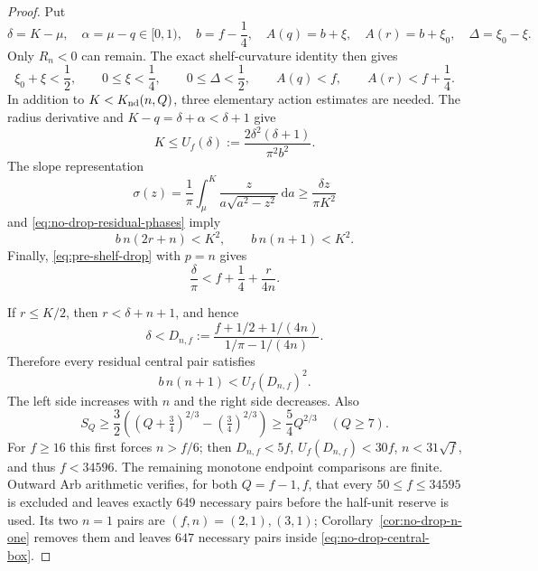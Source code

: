 \documentclass[11pt]{article}
\theoremstyle{remark}
\newcommand{\dd}{\,\mathrm d}
\begin{document}
\begin{proof}
Put
\[
 \delta=K-\mu,\quad \alpha=\mu-q\in[0,1),\quad b=f-\frac14,
 \quad A(q)=b+\xi,\quad A(r)=b+\xi_0,
 \quad\Delta=\xi_0-\xi.
\]
Only $R_n<0$ can remain.  The exact shelf-curvature identity then gives
\begin{equation}
 \xi_0+\xi<\frac12,\qquad0\leq\xi<\frac14,\qquad
 0\leq\Delta<\frac12,\qquad A(q)<f,\qquad A(r)<f+\frac14.
 \label{eq:no-drop-residual-phases}
\end{equation}
In addition to $K<K_{\rm nd}(n,Q)$, three elementary action estimates are
needed.  The radius derivative and $K-q=\delta+\alpha<\delta+1$ give
\begin{equation}
 K\leq U_f(\delta):=
 \frac{2\delta^2(\delta+1)}{\pi^2b^2}.
 \label{eq:no-drop-upper-geometry}
\end{equation}
The slope representation
\[
 \sigma(z)=\frac1\pi\int_\mu^K
 \frac{z}{a\sqrt{a^2-z^2}}\dd a
 \geq\frac{\delta z}{\pi K^2}
\]
and \eqref{eq:no-drop-residual-phases} imply
\begin{equation}
 b\,n(2r+n)<K^2,\qquad b\,n(n+1)<K^2.
 \label{eq:no-drop-slope-geometry}
\end{equation}
Finally, \eqref{eq:pre-shelf-drop} with $p=n$ gives
\begin{equation}
 \frac\delta\pi<f+\frac14+\frac r{4n}.
 \label{eq:no-drop-width-geometry}
\end{equation}

If $r\leq K/2$, then $r<\delta+n+1$, and hence
\[
 \delta<D_{n,f}:=
 \frac{f+1/2+1/(4n)}{1/\pi-1/(4n)}.
\]
Therefore every residual central pair satisfies
\begin{equation}
 b\,n(n+1)<U_f(D_{n,f})^2.
 \label{eq:no-drop-central-obstruction}
\end{equation}
The left side increases with $n$ and the right side decreases.  Also
\[
 S_Q\geq\frac32\left((Q+\tfrac34)^{2/3}
 -(\tfrac34)^{2/3}\right)\geq\frac54Q^{2/3}\quad(Q\geq7).
\]
For $f\geq16$ this first forces $n>f/6$; then
$D_{n,f}<5f$, $U_f(D_{n,f})<30f$, $n<31\sqrt f$, and thus
$f<34596$.  The remaining monotone endpoint comparisons are finite.
Outward Arb arithmetic verifies, for both $Q=f-1,f$, that every
$50\leq f\leq34595$ is excluded and leaves exactly 649 necessary pairs
before the half-unit reserve is used.  Its two $n=1$ pairs are
$(f,n)=(2,1),(3,1)$; Corollary~\ref{cor:no-drop-n-one} removes them and
leaves $647$ necessary pairs inside \eqref{eq:no-drop-central-box}.


\end{proof}
\end{document}
